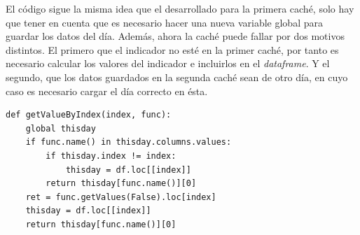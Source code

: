 El c\'odigo sigue la misma idea que el desarrollado para la primera cach\'e, solo hay que tener en cuenta que es necesario hacer una nueva variable global para guardar los datos del d\'ia. Adem\'as, ahora la cach\'e puede fallar por dos motivos distintos. El primero que el indicador no est\'e en la primer cach\'e, por tanto es necesario calcular los valores del indicador e incluirlos en el \textit{dataframe}. Y el segundo, que los datos guardados en la segunda cach\'e sean de otro d\'ia, en cuyo caso es necesario cargar el d\'ia correcto en \'esta.\\

\begin{lstlisting}
def getValueByIndex(index, func):
	global thisday
	if func.name() in thisday.columns.values:
		if thisday.index != index:
			thisday = df.loc[[index]]
		return thisday[func.name()][0]
	ret = func.getValues(False).loc[index]
	thisday = df.loc[[index]]
	return thisday[func.name()][0]
\end{lstlisting}
